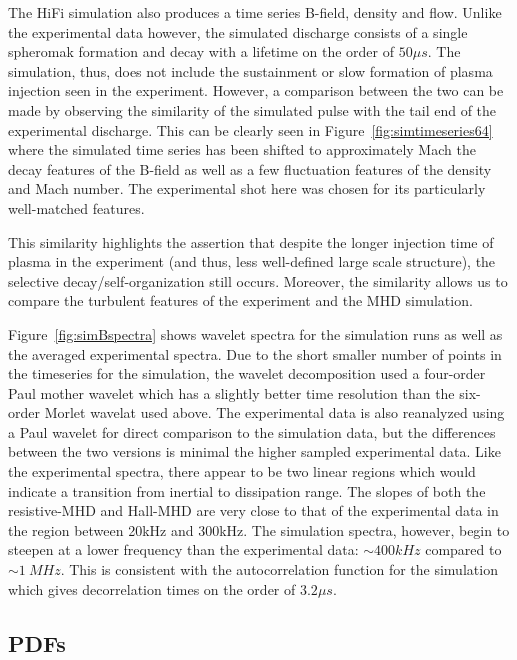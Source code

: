 \documentclass[12pt]{iopart}
\begin{document}
The HiFi simulation also produces a time series B-field, density and flow. Unlike the experimental data however, the simulated discharge consists of a single spheromak formation and decay with a lifetime on the order of $50 \mu s$. The simulation, thus, does not include the sustainment or slow formation of plasma injection seen in the experiment. However, a comparison between the two can be made by observing the similarity of the simulated pulse with the tail end of the experimental discharge. This can be clearly seen in Figure~\ref{fig:simtimeseries64} where the simulated time series has been shifted to approximately Mach the decay features of the B-field as well as a few fluctuation features of the density and Mach number. The experimental shot here was chosen for its particularly well-matched features.

This similarity highlights the assertion that despite the longer injection time of plasma in the experiment (and thus, less well-defined large scale structure), the selective decay/self-organization still occurs. Moreover, the similarity allows us to compare the turbulent features of the experiment and the MHD simulation.

Figure~\ref{fig:simBspectra} shows wavelet spectra for the simulation runs as well as the averaged experimental spectra. Due to the short smaller number of points in the timeseries for the simulation, the wavelet decomposition used a four-order Paul mother wavelet  which has a slightly better time resolution than the six-order Morlet wavelat used above. The experimental data is also reanalyzed using a Paul wavelet for direct comparison to the simulation data, but the differences between the two versions is minimal the higher sampled experimental data. Like the experimental spectra, there appear to be two linear regions which would indicate a transition from inertial to dissipation range. The slopes of both the resistive-MHD and Hall-MHD are very close to that of the experimental data in the region between 20kHz and 300kHz. The simulation spectra, however, begin to steepen at a lower frequency than the experimental data: $\sim 400kHz$ compared to $\sim 1~MHz$. This is consistent with the autocorrelation function for the simulation which gives decorrelation times on the order of $3.2 \mu s$. 

\subsection{PDFs}
\end{document}
